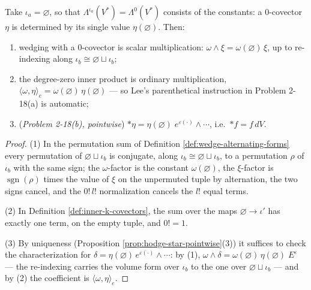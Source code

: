 \begin{proposition}
\label{prop:hodge-star-degree-zero}
\leanok
{}
Take $\iota_a = \varnothing$, so that $\Lambda^{\iota_a}(V^*) = \Lambda^0(V^*)$ consists of the constants: a $0$-covector $\eta$ is determined by its single value $\eta(\varnothing)$. Then:
\begin{enumerate}
\item wedging with a $0$-covector is scalar multiplication: $\omega \wedge \xi = \omega(\varnothing)\,\xi$, up to re-indexing along $\iota_b \cong \varnothing \sqcup \iota_b$;
\item the degree-zero inner product is ordinary multiplication, $\langle \omega, \eta \rangle_e = \omega(\varnothing)\,\eta(\varnothing)$ --- so Lee's parenthetical instruction in Problem 2-18(a) is automatic;
\item (\emph{Problem 2-18(b), pointwise}) ${*}\eta = \eta(\varnothing)\; e^{\varepsilon(\cdot)} \wedge \cdots$, i.e.\ ${*}f = f\, dV$.
\end{enumerate}
\end{proposition}
\begin{proof}
\leanok
(1) In the permutation sum of Definition \ref{def:wedge-alternating-forms} every permutation of $\varnothing \sqcup \iota_b$ is conjugate, along $\iota_b \cong \varnothing \sqcup \iota_b$, to a permutation $\rho$ of $\iota_b$ with the same sign; the $\omega$-factor is the constant $\omega(\varnothing)$, the $\xi$-factor is $\operatorname{sgn}(\rho)$ times the value of $\xi$ on the unpermuted tuple by alternation, the two signs cancel, and the $0!\,l!$ normalization cancels the $l!$ equal terms.

(2) In Definition \ref{def:inner-k-covectors}, the sum over the maps $\varnothing \to \iota'$ has exactly one term, on the empty tuple, and $0! = 1$.

(3) By uniqueness (Proposition \ref{prop:hodge-star-pointwise}(3)) it suffices to check the characterization for $\delta = \eta(\varnothing)\, e^{\varepsilon(\cdot)} \wedge \cdots$: by (1), $\omega \wedge \delta = \omega(\varnothing)\,\eta(\varnothing)\; E^\varepsilon$ --- the re-indexing carries the volume form over $\iota_b$ to the one over $\varnothing \sqcup \iota_b$ --- and by (2) the coefficient is $\langle \omega, \eta \rangle_e$.
\end{proof}

